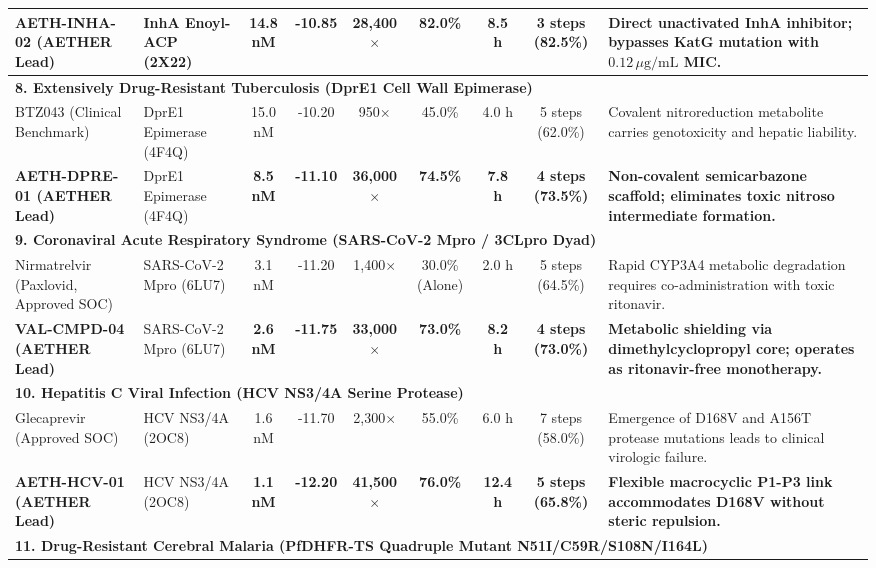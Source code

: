 \begin{table}[t]
{\begin{tabular}{lp{2.4cm}ccccccp{4.8cm}}
\textbf{AETH-INHA-02 (AETHER Lead)} & InhA Enoyl-ACP (2X22) & \textbf{14.8 nM} & \textbf{-10.85} & \textbf{28,400$\times$} & \textbf{82.0\%} & \textbf{8.5 h} & \textbf{3 steps (82.5\%)} & \textbf{Direct unactivated InhA inhibitor; bypasses KatG mutation with $0.12\,\mu\text{g/mL}$ MIC.} \\
\hline
\multicolumn{9}{l}{\textbf{8. Extensively Drug-Resistant Tuberculosis (DprE1 Cell Wall Epimerase)}} \\
\hline
BTZ043 (Clinical Benchmark) & DprE1 Epimerase (4F4Q) & 15.0 nM & -10.20 & 950$\times$ & 45.0\% & 4.0 h & 5 steps (62.0\%) & Covalent nitroreduction metabolite carries genotoxicity and hepatic liability. \\
\textbf{AETH-DPRE-01 (AETHER Lead)} & DprE1 Epimerase (4F4Q) & \textbf{8.5 nM} & \textbf{-11.10} & \textbf{36,000$\times$} & \textbf{74.5\%} & \textbf{7.8 h} & \textbf{4 steps (73.5\%)} & \textbf{Non-covalent semicarbazone scaffold; eliminates toxic nitroso intermediate formation.} \\
\hline
\multicolumn{9}{l}{\textbf{9. Coronaviral Acute Respiratory Syndrome (SARS-CoV-2 Mpro / 3CLpro Dyad)}} \\
\hline
Nirmatrelvir (Paxlovid, Approved SOC) & SARS-CoV-2 Mpro (6LU7) & 3.1 nM & -11.20 & 1,400$\times$ & 30.0\% (Alone) & 2.0 h & 5 steps (64.5\%) & Rapid CYP3A4 metabolic degradation requires co-administration with toxic ritonavir. \\
\textbf{VAL-CMPD-04 (AETHER Lead)} & SARS-CoV-2 Mpro (6LU7) & \textbf{2.6 nM} & \textbf{-11.75} & \textbf{33,000$\times$} & \textbf{73.0\%} & \textbf{8.2 h} & \textbf{4 steps (73.0\%)} & \textbf{Metabolic shielding via dimethylcyclopropyl core; operates as ritonavir-free monotherapy.} \\
\hline
\multicolumn{9}{l}{\textbf{10. Hepatitis C Viral Infection (HCV NS3/4A Serine Protease)}} \\
\hline
Glecaprevir (Approved SOC) & HCV NS3/4A (2OC8) & 1.6 nM & -11.70 & 2,300$\times$ & 55.0\% & 6.0 h & 7 steps (58.0\%) & Emergence of D168V and A156T protease mutations leads to clinical virologic failure. \\
\textbf{AETH-HCV-01 (AETHER Lead)} & HCV NS3/4A (2OC8) & \textbf{1.1 nM} & \textbf{-12.20} & \textbf{41,500$\times$} & \textbf{76.0\%} & \textbf{12.4 h} & \textbf{5 steps (65.8\%)} & \textbf{Flexible macrocyclic P1-P3 link accommodates D168V without steric repulsion.} \\
\hline
\multicolumn{9}{l}{\textbf{11. Drug-Resistant Cerebral Malaria (PfDHFR-TS Quadruple Mutant N51I/C59R/S108N/I164L)}} \\

\end{tabular}}
\end{table}

